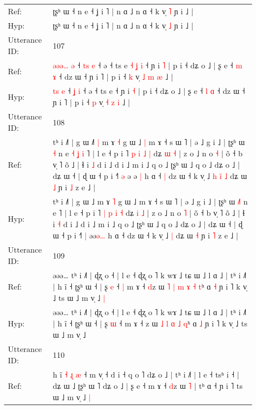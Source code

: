 \documentclass[10pt]{article}
\DeclareRobustCommand{\hl}[1]{{\textcolor{red}{#1}}}
\begin{document}
\begin{longtable}{ll}
Ref: & ʈʂʰ ɯ ˧ n e ˧ ʝ i ˥ | n ɑ ˩ n ɑ ˧ k v̩ \hl{˥} ɲ i ˩ |
 \\
Hyp: & ʈʂʰ ɯ ˧ n e ˧ ʝ i ˥ | n ɑ ˩ n ɑ ˧ k v̩ \hl{˩} ɲ i ˩ |
 \\
\midrule
Utterance ID: & 107 \\
Ref: & \hl{ə}\hl{ə}\hl{ə}\hl{…} \hl{ə} ˧ \hl{t}\hl{s} \hl{e} ˧ ə ˧ ts e\hl{ }\hl{˧}\hl{ }\hl{ʝ}\hl{ }\hl{i} ˧ ɲ i \hl{˥} | p i ˧ dʑ o ˩ | ʂ e ˧ \hl{m} \hl{ɤ} ˧ dz ɯ ˧ ɲ i ˥ | p i ˧ \hl{k} v̩ \hl{˩} \hl{m} \hl{æ} ˩ |
 \\
Hyp: & \hl{}\hl{}\hl{t}\hl{s} \hl{e} ˧ \hl{}\hl{ʝ} \hl{i} ˧ ə ˧ ts e\hl{}\hl{}\hl{}\hl{}\hl{}\hl{} ˧ ɲ i \hl{˧} | p i ˧ dʑ o ˩ | ʂ e ˧ \hl{l} \hl{ɑ} ˧ dz ɯ ˧ ɲ i ˥ | p i ˧ \hl{p} v̩ \hl{˧} \hl{z} \hl{i} ˩ |
 \\
\midrule
Utterance ID: & 108 \\
Ref: & tʰ i ˩˥ | g ɯ ˩\hl{˥}\hl{ }\hl{|} m ɤ \hl{˧} g ɯ ˩\hl{ }\hl{|} m ɤ ˧ s ɯ ˥ | ə ˩ g i ˩ | ʈʂʰ ɯ \hl{}\hl{˧} n e\hl{ }\hl{˧}\hl{ }\hl{ʝ}\hl{ }\hl{i} ˥ | l e ˧ p i ˥ \hl{p} \hl{i} \hl{˩} \hl{|} dʑ \hl{ɯ} \hl{˧} | z o ˩ n o \hl{˧} | õ ˧ b v̩ ˥ õ ˩ | ɬ i \hl{˩} d i ˩ d i ˩ m i ˩ q o ˩ ʈʂʰ ɯ ˩ q o ˩ dʑ o ˩ | dʑ ɯ ˧ | ɖ ɯ ˧ p i ˧˥ \hl{ə} ə\hl{ }ə\hl{ }\hl{|} h ɑ ˧\hl{ }\hl{|} dz ɯ ˧ k v̩ ˩\hl{ }\hl{h}\hl{ }\hl{i}\hl{̃} \hl{˩} dʑ ɯ \hl{˩} ɲ i \hl{˩} z e ˩ |
 \\
Hyp: & tʰ i ˩˥ | g ɯ ˩\hl{}\hl{}\hl{} m ɤ \hl{˥} g ɯ ˩\hl{}\hl{} m ɤ ˧ s ɯ ˥ | ə ˩ g i ˩ | ʈʂʰ ɯ \hl{˩}\hl{˥} n e\hl{}\hl{}\hl{}\hl{}\hl{}\hl{} ˥ | l e ˧ p i ˥ \hl{|} \hl{p} \hl{i} \hl{˧} dʑ \hl{i} \hl{˩} | z o ˩ n o \hl{˥} | õ ˧ b v̩ ˥ õ ˩ | ɬ i \hl{˧} d i ˩ d i ˩ m i ˩ q o ˩ ʈʂʰ ɯ ˩ q o ˩ dʑ o ˩ | dʑ ɯ ˧ | ɖ ɯ ˧ p i ˧˥ \hl{|} ə\hl{}ə\hl{ə}\hl{…} h ɑ ˧\hl{}\hl{} dz ɯ ˧ k v̩ ˩\hl{}\hl{}\hl{}\hl{}\hl{} \hl{|} dʑ ɯ \hl{˧} ɲ i \hl{˥} z e ˩ |
 \\
\midrule
Utterance ID: & 109 \\
Ref: & əəə… tʰ i ˩˥ | ɖʐ o ˧ | l e ˧ ɖʐ o ˥ k wɤ ˩ tɕ ɯ ˩ l ɑ ˩ | tʰ i ˩˥ | h ĩ ˧ ʈʂʰ ɯ ˧ | ʂ \hl{e} ˧\hl{ }\hl{|} m ɤ ˧ \hl{d}z ɯ\hl{ }\hl{˥} \hl{|} \hl{m} \hl{ɤ} \hl{˧} \hl{t}ʰ ɑ \hl{˧} ɲ i ˥ k v̩ ˩ ts ɯ ˩ m v̩ ˩\hl{ }\hl{|}
 \\
Hyp: & əəə… tʰ i ˩˥ | ɖʐ o ˧ | l e ˧ ɖʐ o ˥ k wɤ ˩ tɕ ɯ ˩ l ɑ ˩ | tʰ i ˩˥ | h ĩ ˧ ʈʂʰ ɯ ˧ | ʂ \hl{ɯ} ˧\hl{}\hl{} m ɤ ˧ \hl{}z ɯ\hl{}\hl{} \hl{˩} \hl{l} \hl{ɑ} \hl{˩} \hl{q}ʰ ɑ \hl{˩} ɲ i ˥ k v̩ ˩ ts ɯ ˩ m v̩ ˩\hl{}\hl{}
 \\
\midrule
Utterance ID: & 110 \\
Ref: & h i\hl{}\hl{}\hl{̃} \hl{˧} \hl{ɻ} \hl{æ} ˧ m v̩ ˧ d i ˧ q o ˥ dʑ o ˩ | tʰ i ˩˥ | l e ˧ tsʰ i ˧\hl{} | dʑ ɯ ˩ ʈʂʰ ɯ ˥ dʑ o ˩ | ʂ e ˧ m ɤ ˧ \hl{d}z ɯ \hl{˥} | tʰ ɑ ˧ ɲ i ˥ ts ɯ ˩\hl{}\hl{} m v̩ ˩\hl{ }\hl{|}

\end{longtable}
\end{document}
